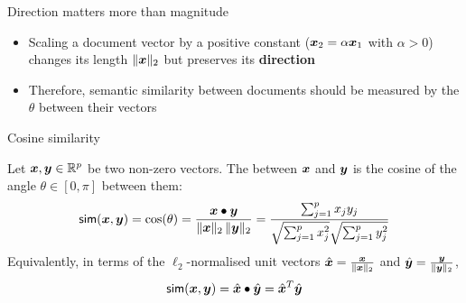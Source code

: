 \documentclass[aspectratio=169]{beamer}\usepackage[]{graphicx}\usepackage[]{xcolor}
\begin{document}
\begin{frame}{Direction matters more than magnitude}
\begin{center}
\end{center}
\vfill
\begin{itemize}
\item Scaling a document vector by a positive constant ($\bm{x}_2 = \alpha \bm{x}_1$ with $\alpha > 0$) changes its length $\|\bm{x}\|_2$ but preserves its \textbf{direction}
\item Therefore, semantic similarity between documents should be measured by the  $\theta$ between their vectors
\end{itemize}
\end{frame}


\begin{frame}{Cosine similarity}
\begin{importantdefinition}
Let $\bm{x}, \bm{y} \in \mathbb{R}^p$ be two non-zero vectors. The  between $\bm{x}$ and $\bm{y}$ is the cosine of the angle $\theta \in [0, \pi]$ between them:
\[
\mathsf{sim}(\bm{x}, \bm{y}) = \cos(\theta) = \frac{\bm{x} \bullet \bm{y}}{\|\bm{x}\|_2 \, \|\bm{y}\|_2}
= \frac{\sum_{j=1}^p x_j y_j}{\sqrt{\sum_{j=1}^p x_j^2}\sqrt{\sum_{j=1}^p y_j^2}}
\]
Equivalently, in terms of the $\ell_2$-normalised unit vectors $\hat{\bm{x}} = \frac{\bm{x}}{\|\bm{x}\|_2}$ and $\hat{\bm{y}} = \frac{\bm{y}}{\|\bm{y}\|_2}$,
\[
\mathsf{sim}(\bm{x}, \bm{y}) = \hat{\bm{x}} \bullet \hat{\bm{y}} = \hat{\bm{x}}^T \hat{\bm{y}}
\]
\end{importantdefinition}
\end{frame}
\end{document}
